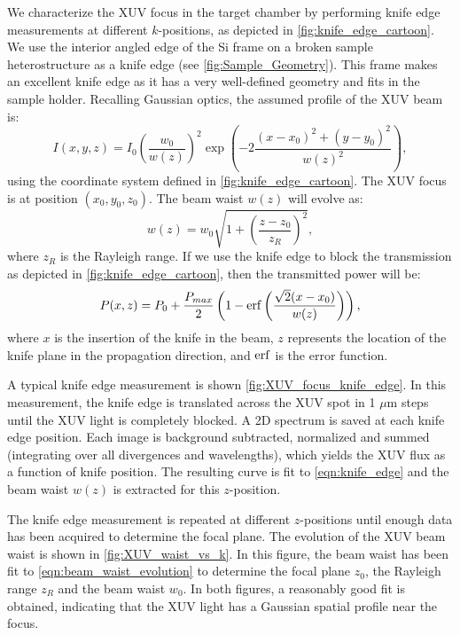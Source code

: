 We characterize the XUV focus in the target chamber by performing knife edge measurements at different $k$-positions, as depicted in \cref{fig:knife_edge_cartoon}. We use the interior angled edge of the Si frame on a broken sample heterostructure as a knife edge (see \cref{fig:Sample_Geometry}). This frame makes an excellent knife edge as it has a very well-defined geometry and fits in the sample holder. Recalling Gaussian optics, the assumed profile of the XUV beam is:
\begin{equation}
I(x,y,z) = I_0 \left( \frac{w_0}{w(z)} \right)^2 \exp \left( -2 \frac{ (x-x_0)^2 + (y-y_0)^2 }{w(z)^2} \right),
\end{equation}
using the coordinate system defined in \cref{fig:knife_edge_cartoon}. The XUV focus is at position $(x_0,y_0,z_0)$. The beam waist $w(z)$ will evolve as:
\begin{equation}
w(z) = w_0 \sqrt{ 1 + \left( \frac{z-z_0}{z_R} \right)^2 },
\label{eqn:beam_waist_evolution}
\end{equation}
where $z_R$ is the Rayleigh range. If we use the knife edge to block the transmission as depicted in \cref{fig:knife_edge_cartoon}, then the transmitted power will be:
\begin{equation}
P(x, z) = P_0 + \frac{P_{max}}{2} \left( 1 - \erf \left( \frac{\sqrt{2}(x-x_0)}{w(z)} \right) \right),
\label{eqn:knife_edge}
\end{equation}
where $x$ is the insertion of the knife in the beam, $z$ represents the location of the knife plane in the propagation direction, and $\erf$ is the error function.

A typical knife edge measurement is shown \cref{fig:XUV_focus_knife_edge}. In this measurement, the knife edge is translated across the XUV spot in 1 $\mu$m steps until the XUV light is completely blocked. A 2D spectrum is saved at each knife edge position. Each image is background subtracted, normalized and summed (integrating over all divergences and wavelengths), which yields the XUV flux as a function of knife position. The resulting curve is fit to \cref{eqn:knife_edge} and the beam waist $w(z)$ is extracted for this $z$-position.

The knife edge measurement is repeated at different $z$-positions until enough data has been acquired to determine the focal plane. The evolution of the XUV beam waist is shown in \cref{fig:XUV_waist_vs_k}. In this figure, the beam waist has been fit to \cref{eqn:beam_waist_evolution} to determine the focal plane $z_0$, the Rayleigh range $z_R$ and the beam waist $w_0$. In both figures, a reasonably good fit is obtained, indicating that the XUV light has a Gaussian spatial profile near the focus.


